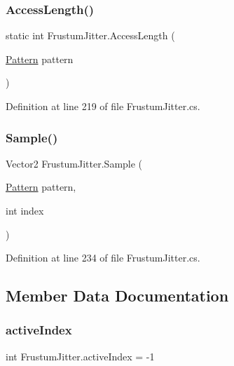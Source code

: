 \subsubsection{\texorpdfstring{Access\+Length()}{AccessLength()}}
{\footnotesize\ttfamily static int Frustum\+Jitter.\+Access\+Length (\begin{DoxyParamCaption}\item[{\mbox{\hyperlink{class_frustum_jitter_a11a9007fdc6ca37500098c619213e3d3}{Pattern}}}]{pattern }\end{DoxyParamCaption})\hspace{0.3cm}{\ttfamily [static]}}



Definition at line 219 of file Frustum\+Jitter.\+cs.

\mbox{\label{class_frustum_jitter_a877d61fdb3075c72bc3ccb37601ef6a6}} 
\subsubsection{\texorpdfstring{Sample()}{Sample()}}
{\footnotesize\ttfamily Vector2 Frustum\+Jitter.\+Sample (\begin{DoxyParamCaption}\item[{\mbox{\hyperlink{class_frustum_jitter_a11a9007fdc6ca37500098c619213e3d3}{Pattern}}}]{pattern,  }\item[{int}]{index }\end{DoxyParamCaption})}



Definition at line 234 of file Frustum\+Jitter.\+cs.



\subsection{Member Data Documentation}
\mbox{\label{class_frustum_jitter_a69f5661b1f89b2fd3f86c6eb406f0687}} 
\subsubsection{\texorpdfstring{active\+Index}{activeIndex}}
{\footnotesize\ttfamily int Frustum\+Jitter.\+active\+Index = -\/1}



